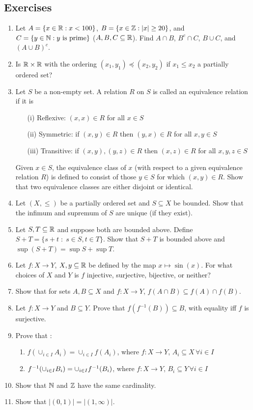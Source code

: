 \documentclass{article}
\begin{document}
\subsection{Exercises}
\label{subsec:ex_set_theory}
\begin{enumerate}
	\item Let $A = \{x\in {\mathbb{R}} : x <100\}$, $B = \{x\in {\mathbb{Z}} : |x| \geq 20\}$, and $C = \{y \in {\mathbb{N}} : y \text{ is prime}\}$ ($A,B,C \subseteq {\mathbb{R}}$). Find $A \cap B$, $B^c \cap C$, $B \cup C$, and $(A \cup B )^c$.
    \item Is ${\mathbb{R}} \times {\mathbb{R}}$ with the ordering $(x_1,y_1) \preceq (x_2,y_2)$ if $x_1 \leq x_2$ a partially ordered set? 
     \item \cite[Exercise 1.3.1]{tastetopology} Let $S$ be a non-empty set. A relation $R$ on $S$ is called an equivalence relation if it is
    \begin{enumerate}
        \item[(i)] Reflexive: $(x,x) \in R$ for all $x \in S$
        \item[(ii)] Symmetric: if $(x,y) \in R$  then $(y,x) \in R$ for all $x,y \in S$
        \item[(iii)] Transitive: if $(x,y), (y,z) \in R$ then $(x,z) \in R$ for all $x,y,z \in S$
    \end{enumerate}
Given $x \in S$, the equivalence class of $x$ (with respect to a given equivalence relation $R$) is defined to consist of those $y \in S$ for which $(x,y) \in R$. Show that two equivalence classes are either disjoint or identical.
    \item Let $(X, \leq)$ be a partially ordered set and $S\subseteq X$ be bounded. Show that the infimum and supremum of $S$ are unique (if they exist).
    \item Let $S,T \subseteq {\mathbb{R}}$ and suppose both are bounded above. Define $S+T = \{s + t \; \colon \; s\in S,t\in T\}$. Show that $S+T$ is bounded above and $\sup(S+T) = \sup S + \sup T$. 
    \item Let $f: X \to Y$, $X, y \subseteq {\mathbb{R}}$ be defined by the map $x \mapsto \sin(x)$. For what choices of $X$ and $Y$ is $f$ injective, surjective, bijective, or neither?
    \item Show that for sets $A,B \subseteq X$ and $f: X \to Y$, $f(A \cap B) \subseteq f(A) \cap f(B)$.
    \item Let $f: X \to Y$ and $B \subseteq Y$. Prove that $f(f^{-1}(B)) \subseteq B$, with equality iff $f$ is surjective.
    \item Prove that :
    \begin{enumerate}
        \item $f(\cup_{i \in I}A_i) = \cup_{i \in I}f(A_i)$, where $f:X \to Y$, $A_i \subseteq X \, \forall i \in I$
        \item $f^{-1}(\cup_{i \in I}B_i) = \cup_{i \in I}f^{-1}(B_i)$, where $f:X \to Y$, $B_i \subseteq Y \, \forall i \in I$
    \end{enumerate}
    \item Show that ${\mathbb{N}}$ and ${\mathbb{Z}}$ have the same cardinality.
    \item Show that $|(0,1)| =|(1,\infty)|$.
\end{enumerate}
\end{document}

